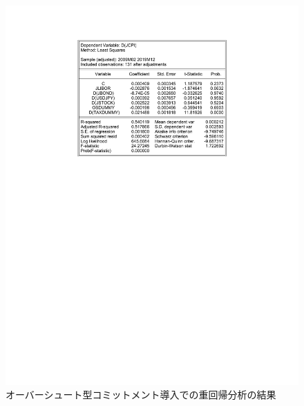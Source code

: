 \documentclass[12pt]{jarticle}
\begin{document}
{\begin{figure}[!htbp]
  \centering
  \caption{オーバーシュート型コミットメント導入での重回帰分析の結果}
  \vspace{5pt}
  \includegraphics[width=12cm]{os.pdf}
\end{figure}


}
\end{document}
